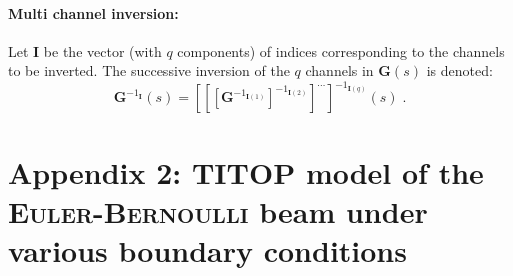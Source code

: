 \documentclass[smallcondensed]{svjour3}     %
\begin{document}
\paragraph{Multi channel inversion:} Let $\mathbf{I}$ be the vector (with $q$ components) of indices corresponding to the channels to be inverted. The successive inversion of the $q$ channels in $\mathbf{G}(s)$ is denoted:
\begin{equation}
\mathbf{G}^{-1_{\mathbf{I}}}(s)=\left[\left[\left[\mathbf{G}^{-1_{\mathbf{I}(1)}}\right]^{-1_{\mathbf{I}(2)}}\right]^{\cdots}\right]^{-1_{\mathbf{I}(q)}}(s)\;.
\end{equation}

\section*{Appendix 2: TITOP model of the \textsc{Euler-Bernoulli} beam under various boundary conditions}
\end{document}
